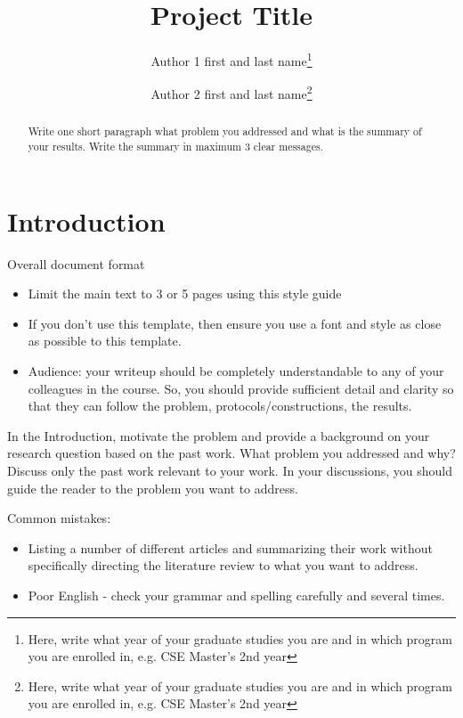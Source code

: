 \documentclass[10pt]{article}
\begin{document}
\setlength{\droptitle}{-7em}

\title{Project Title}
\author{ Author 1 first and last name\thanks{Here, write what year of your graduate studies you are and in which program you are enrolled in, e.g. CSE Master's 2nd year} \and Author 2 first and last name\thanks{Here, write what year of your graduate studies you are and in which program you are enrolled in, e.g. CSE Master's 2nd year}}%
%




\date{}
\maketitle
\vspace*{-1cm}
\begin{abstract}%
Write one short paragraph what problem you addressed and what is the summary of your  results. Write the summary in maximum 3 clear messages. 
\end{abstract}



\section{Introduction}\label{sec:intro}

Overall document format
\begin{itemize}
  \item Limit the main text to 3 or 5 pages using this style guide
  \item If you don't use this template, then ensure you use a font and style as close as possible to this template. 
  \item Audience: your writeup should be completely understandable to any of your colleagues in the course.  So, you should provide sufficient detail and clarity so that they can follow the problem, protocols/constructions, the results. 
  \end{itemize}

In the Introduction, motivate the problem and provide a background on your research question based on the past work. What problem you addressed and why? Discuss only the past work relevant to your work. In your discussions, you should guide the reader to the problem you want to address. 

Common mistakes: 
\begin{itemize}
\item Listing a number of different articles and summarizing their work without specifically directing the literature review to what you want to address. 
\item Poor English - check your grammar and spelling carefully and several times. 
\end{itemize}
\end{document}
